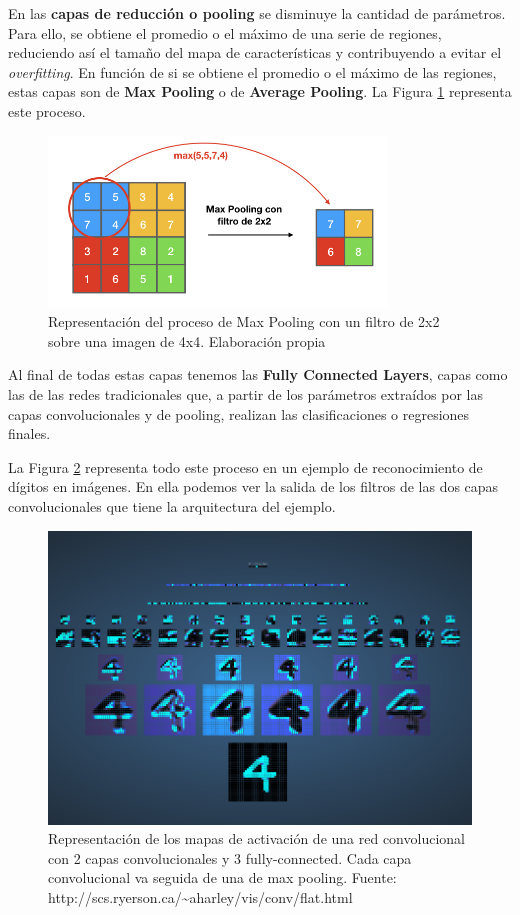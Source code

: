 \documentclass[
  12pt,
  spanish,
  a4paperpaper,
]{report}
\begin{document}
En las \textbf{capas de reducción o pooling} se disminuye la cantidad de
parámetros. Para ello, se obtiene el promedio o el máximo de una serie
de regiones, reduciendo así el tamaño del mapa de características y
contribuyendo a evitar el \emph{overfitting}. En función de si se
obtiene el promedio o el máximo de las regiones, estas capas son de
\textbf{Max Pooling} o de \textbf{Average Pooling}. La Figura
\ref{maxpool} representa este proceso.

\begin{figure}
\centering
\includegraphics[width=0.8\textwidth,height=\textheight]{source/figures/maxpool.jpeg}
\caption{Representación del proceso de Max Pooling con un filtro de 2x2
sobre una imagen de 4x4. Elaboración propia \label{maxpool}}
\end{figure}

Al final de todas estas capas tenemos las \textbf{Fully Connected
Layers}, capas como las de las redes tradicionales que, a partir de los
parámetros extraídos por las capas convolucionales y de pooling,
realizan las clasificaciones o regresiones finales.

La Figura \ref{conv} representa todo este proceso en un ejemplo de
reconocimiento de dígitos en imágenes. En ella podemos ver la salida de
los filtros de las dos capas convolucionales que tiene la arquitectura
del ejemplo.

\begin{figure}
\centering
\includegraphics[width=1\textwidth,height=\textheight]{source/figures/conv.png}
\caption{Representación de los mapas de activación de una red
convolucional con 2 capas convolucionales y 3 fully-connected. Cada capa
convolucional va seguida de una de max pooling. Fuente:
http://scs.ryerson.ca/\textasciitilde aharley/vis/conv/flat.html
\label{conv}}
\end{figure}
\end{document}
